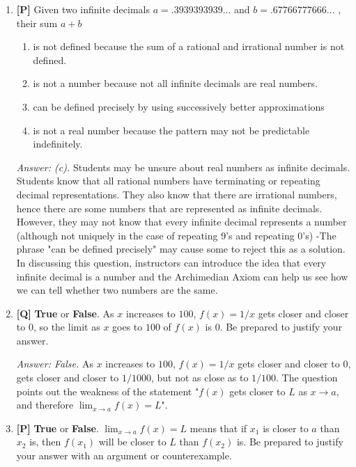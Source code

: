 \documentclass[12pt]{article}
\begin{document}
\begin{enumerate}
\bigskip

\item {\bf [P]} Given two infinite decimals $a=. 3939393939...$ and $b= . 67766777666...$ , 
their sum $a+b$
\begin {enumerate}
\item is not defined because the sum of a rational and irrational number is 
not defined.
\item is not a number because not all infinite decimals are real numbers.
\item can be defined precisely by using successively better approximations
\item is not a real number because the pattern may not be predictable 
indefinitely.
\end {enumerate}

{\it Answer: (c).} Students may be unsure about real numbers as infinite 
decimals. Students know that all rational numbers have terminating or 
repeating decimal representations. They also know that there are irrational 
numbers, hence there are some numbers that are represented as infinite 
decimals. However, they may not know that every infinite decimal 
represents a number (although not uniquely in the case of repeating 9's and 
repeating 0's) -The phrase "can be defined precisely" may cause some to 
reject this as a solution. In discussing this question, instructors can 
introduce the idea that every infinite decimal is a number and the 
Archimedian Axiom can help us see how we can tell whether two numbers are 
the same. 

\bigskip

\item {\bf [Q]} \textbf{True} or \textbf{False}.  As $x$ increases to $100$,
$f(x)=1/x$ gets closer and closer to $0$, so the limit as $x$ goes
to $100$ of $f(x)$ is $0$.  Be prepared to justify your answer.

{\it Answer: False.} As $x$ increases to $100$,
$f(x)=1/x$ gets closer and closer to $0$, gets closer and closer to $1/1000$, but not as close as to $1/100$. 
The question points out the weakness of the statement "$f(x)$ gets closer to $L$ as $x\to a$, and therefore $\displaystyle{\lim_{x\rightarrow a}f(x)=L}$".

\bigskip

\item {\bf [P]} \textbf{True} or \textbf{False}.  
$\displaystyle{\lim_{x\rightarrow a}f(x)=L}$
means that if $x_1$ is closer to $a$ than $x_2$ is, then 
$f(x_1)$ will be closer to $L$ than $f(x_2)$ is.  Be prepared to 
justify your answer with an argument or counterexample. 


\end{enumerate}
\end{document}
